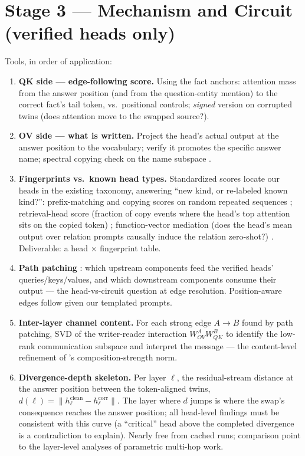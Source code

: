 \documentclass[11pt,a4paper]{article}
\begin{document}
\section{Stage 3 --- Mechanism and Circuit (verified heads only)}
Tools, in order of application:
\begin{enumerate}[itemsep=2pt]
\item \textbf{QK side --- edge-following score.} Using the fact anchors: attention mass from the answer position (and from the question-entity mention) to the correct fact's tail token, vs.\ positional controls; \emph{signed} version on corrupted twins (does attention move to the swapped source?).
\item \textbf{OV side --- what is written.} Project the head's actual output at the answer position to the vocabulary; verify it promotes the specific answer name; spectral copying check on the name subspace \cite{framework}.
\item \textbf{Fingerprints vs.\ known head types.} Standardized scores locate our heads in the existing taxonomy, answering ``new kind, or re-labeled known kind?'': prefix-matching and copying scores on random repeated sequences \cite{olsson}; retrieval-head score (fraction of copy events where the head's top attention sits on the copied token) \cite{retrieval}; function-vector mediation (does the head's mean output over relation prompts causally induce the relation zero-shot?) \cite{fv}. Deliverable: a head $\times$ fingerprint table.
\item \textbf{Path patching} \cite{ioi,patchguide}: which upstream components feed the verified heads' queries/keys/values, and which downstream components consume their output --- the head-vs-circuit question at edge resolution. Position-aware edges follow \cite{peap} given our templated prompts.
\item \textbf{Inter-layer channel content.} For each strong edge $A\!\to\!B$ found by path patching, SVD of the writer-reader interaction $W^A_{OV} W^B_{QK}$ to identify the low-rank communication subspace and interpret the message \cite{talking} --- the content-level refinement of \cite{framework}'s composition-strength norm.
\item \textbf{Divergence-depth skeleton.} Per layer $\ell$, the residual-stream distance at the answer position between the token-aligned twins, $d(\ell)=\|h^{\text{clean}}_\ell - h^{\text{corr}}_\ell\|$. The layer where $d$ jumps is where the swap's consequence reaches the answer position; all head-level findings must be consistent with this curve (a ``critical'' head above the completed divergence is a contradiction to explain). Nearly free from cached runs; comparison point to the layer-level analyses of parametric multi-hop work.

\end{enumerate}
\end{document}
